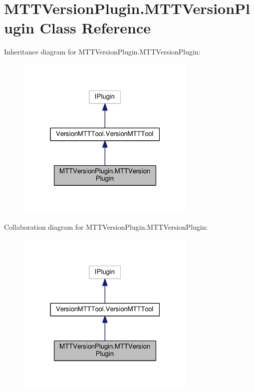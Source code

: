 \hypertarget{class_m_t_t_version_plugin_1_1_m_t_t_version_plugin}{\section{M\-T\-T\-Version\-Plugin.\-M\-T\-T\-Version\-Plugin Class Reference}
\label{class_m_t_t_version_plugin_1_1_m_t_t_version_plugin}
}


Inheritance diagram for M\-T\-T\-Version\-Plugin.\-M\-T\-T\-Version\-Plugin\-:
\nopagebreak
\begin{figure}[H]
\begin{center}
\leavevmode
\includegraphics[width=244pt]{class_m_t_t_version_plugin_1_1_m_t_t_version_plugin__inherit__graph}
\end{center}
\end{figure}


Collaboration diagram for M\-T\-T\-Version\-Plugin.\-M\-T\-T\-Version\-Plugin\-:
\nopagebreak
\begin{figure}[H]
\begin{center}
\leavevmode
\includegraphics[width=244pt]{class_m_t_t_version_plugin_1_1_m_t_t_version_plugin__coll__graph}
\end{center}
\end{figure}
